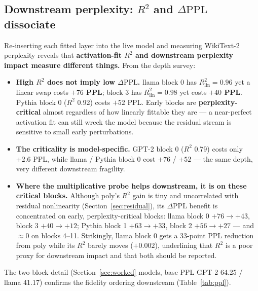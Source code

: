 \documentclass{article}
\newcommand{\Rlin}{R^2_{\mathrm{lin}}}
\newcommand{\dppl}{\Delta\mathrm{PPL}}
\begin{document}
\subsection{Downstream perplexity: \texorpdfstring{$R^2$}{R2} and \texorpdfstring{$\dppl$}{dPPL} dissociate}
\label{sec:ppl}

Re-inserting each fitted layer into the live model and measuring WikiText-2 perplexity reveals
that \textbf{activation-fit $R^2$ and downstream perplexity impact measure different things.}
From the depth survey:
\begin{itemize}
\item \textbf{High $R^2$ does not imply low $\dppl$.} llama block 0 has $\Rlin = 0.96$ yet a
  linear swap costs \textbf{$+76$ PPL}; block 3 has $\Rlin = 0.98$ yet costs \textbf{$+40$ PPL}.
  Pythia block 0 ($R^2$ 0.92) costs $+52$ PPL. Early blocks are \textbf{perplexity-critical}
  almost regardless of how linearly fittable they are --- a near-perfect activation fit can still
  wreck the model because the residual stream is sensitive to small early perturbations.
\item \textbf{The criticality is model-specific.} GPT-2 block 0 ($R^2$ 0.79) costs only $+2.6$
  PPL, while llama / Pythia block 0 cost $+76$ / $+52$ --- the same depth, very different
  downstream fragility.
\item \textbf{Where the multiplicative probe helps downstream, it is on these critical blocks.}
  Although poly's \emph{$R^2$} gain is tiny and uncorrelated with residual nonlinearity
  (Section~\ref{sec:residual}), its \emph{$\dppl$} benefit is concentrated on early,
  perplexity-critical blocks: llama block 0 $+76 \to +43$, block 3 $+40 \to +12$; Pythia block 1
  $+63 \to +33$, block 2 $+56 \to +27$ --- and $\approx 0$ on blocks 4--11. Strikingly, llama
  block 0 gets a 33-point PPL reduction from poly while its $R^2$ barely moves ($+0.002$),
  underlining that $R^2$ is a poor proxy for downstream impact and that both should be reported.
\end{itemize}

The two-block detail (Section~\ref{sec:worked} models, base PPL GPT-2 64.25 / llama 41.17)
confirms the fidelity ordering downstream (Table~\ref{tab:ppl}).
\end{document}
